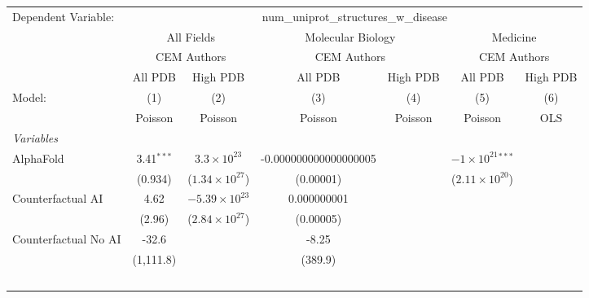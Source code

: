 \begingroup
\centering
\begin{tabular}{lcccccc}
   \tabularnewline \midrule \midrule
   Dependent Variable: & \multicolumn{6}{c}{num\_uniprot\_structures\_w\_disease}\\
 & \multicolumn{2}{c}{All Fields} & \multicolumn{2}{c}{Molecular Biology} & \multicolumn{2}{c}{Medicine} \\
\cmidrule(lr){2-3} \cmidrule(lr){4-5} \cmidrule(lr){6-7}
 & \multicolumn{2}{c}{CEM Authors} & \multicolumn{2}{c}{CEM Authors} & \multicolumn{2}{c}{CEM Authors} \\
\cmidrule(lr){2-3} \cmidrule(lr){4-5} \cmidrule(lr){6-7}
 & \multicolumn{1}{c}{All PDB} & \multicolumn{1}{c}{High PDB} & \multicolumn{1}{c}{All PDB} & \multicolumn{1}{c}{High PDB} & \multicolumn{1}{c}{All PDB} & \multicolumn{1}{c}{High PDB} \\
\cmidrule(lr){2-2} \cmidrule(lr){3-3} \cmidrule(lr){4-4} \cmidrule(lr){5-5} \cmidrule(lr){6-6} \cmidrule(lr){7-7}
   Model:                                                  & (1)          & (2)                     & (3)                   & (4)     & (5)                         & (6)\\  
                                                           &  Poisson     & Poisson                 & Poisson               & Poisson & Poisson                     & OLS\\  
   \midrule
   \emph{Variables}\\
   AlphaFold                                               & 3.41$^{***}$ & $3.3\times 10^{23}$     & -0.000000000000000005 &         & $-1\times 10^{21}$$^{***}$  &   \\   
                                                           & (0.934)      & ($1.34\times 10^{27}$)  & (0.00001)             &         & ($2.11\times 10^{20}$)      &   \\   
   Counterfactual AI                                       & 4.62         & $-5.39\times 10^{23}$   & 0.000000001           &         &                             &   \\   
                                                           & (2.96)       & ($2.84\times 10^{27}$)  & (0.00005)             &         &                             &   \\   
   Counterfactual No AI                                    & -32.6        &                         & -8.25                 &         &                             &   \\   
                                                           & (1,111.8)    &                         & (389.9)               &         &                             &   \\   
$$
\end{tabular}
